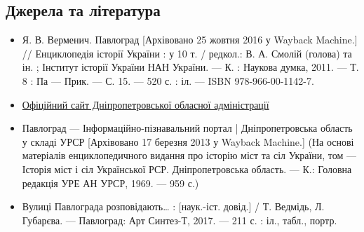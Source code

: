 \subsection{Джерела та література}
\begin{itemize}
	\item Я. В. Верменич. Павлоград [Архівовано 25 жовтня 2016 у Wayback Machine.] // Енциклопедія історії України : у 10 т. / редкол.: В. А. Смолій (голова) та ін. ; Інститут історії України НАН України. — К. : Наукова думка, 2011. — Т. 8 : Па — Прик. — С. 15. — 520 с. : іл. — ISBN 978-966-00-1142-7.
	\item {\href{https://pavlogradmrada.dp.gov.ua/}%
		{Офіційний сайт Дніпропетровської обласної адміністрації}}
	\item Павлоград — Інформаційно-пізнавальний портал | Дніпропетровська область у складі УРСР [Архівовано 17 березня 2013 у Wayback Machine.] (На основі матеріалів енциклопедичного видання про історію міст та сіл України, том — Історія міст і сіл Української РСР. Дніпропетровська область. — К.: Головна редакція УРЕ АН УРСР, 1969. — 959 с.)
	\item Вулиці Павлограда розповідають… : [наук.-іст. довід.] / Т. Ведмідь, Л. Губарєва. — Павлоград: Арт Синтез-Т, 2017. — 211 с. : іл., табл., портр.
\end{itemize}
